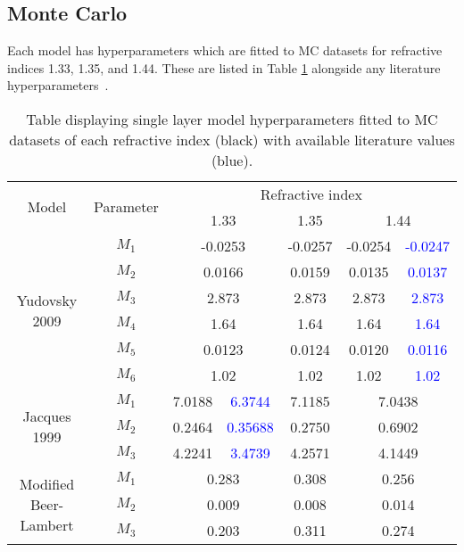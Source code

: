 \subsection{Monte Carlo}\label{sec:resultsMC}
Each model has hyperparameters which are fitted to MC datasets for refractive indices 1.33, 1.35, and 1.44. These are listed in 
Table \ref{tb:fittedmodelparams}
alongside any literature hyperparameters~\citep{Jacques1999, Yudovsky2009}.
\begin{table}[htb!]
    \centering
    \caption{Table displaying single layer model hyperparameters fitted to MC datasets of each refractive index (black) with available literature values (blue).}
    \begin{tabular}{|cc|cc|c|cc|}
        \hline
        \multirow{2}{*}{Model} & \multirow{2}{*}{Parameter} & \multicolumn{5}{c|}{Refractive index} \\
         & & \multicolumn{2}{c|}{1.33} & 1.35 & \multicolumn{2}{c|}{1.44} \\
        \hline
        \multirow{6}{*}{Yudovsky 2009} & $M_1$ & \multicolumn{2}{c|}{-0.0253} & -0.0257 & -0.0254 & \textcolor{blue}{-0.0247} \\
        & $M_2$ & \multicolumn{2}{c|}{0.0166} & 0.0159 & 0.0135 & \textcolor{blue}{0.0137} \\
        & $M_3$ & \multicolumn{2}{c|}{2.873} & 2.873 & 2.873 & \textcolor{blue}{2.873} \\
        & $M_4$ & \multicolumn{2}{c|}{1.64} & 1.64 & 1.64 & \textcolor{blue}{1.64} \\
        & $M_5$ & \multicolumn{2}{c|}{0.0123} & 0.0124 & 0.0120 & \textcolor{blue}{0.0116} \\
        & $M_6$ & \multicolumn{2}{c|}{1.02} & 1.02 & 1.02 & \textcolor{blue}{1.02} \\
        \hline 
        \multirow{3}{*}{Jacques 1999} & $M_1$ & 7.0188 & \textcolor{blue}{6.3744} & 7.1185 & \multicolumn{2}{c|}{7.0438} \\
        & $M_2$ & 0.2464 & \textcolor{blue}{0.35688} & 0.2750 & \multicolumn{2}{c|}{0.6902} \\
        & $M_3$ & 4.2241 & \textcolor{blue}{3.4739} & 4.2571 & \multicolumn{2}{c|}{4.1449} \\
        \hline
        \multirow{3}{*}{Modified Beer-Lambert} & $M_1$ & \multicolumn{2}{c|}{0.283} & 0.308 & \multicolumn{2}{c|}{0.256} \\
        & $M_2$ & \multicolumn{2}{c|}{0.009} & 0.008 & \multicolumn{2}{c|}{0.014} \\
        & $M_3$ & \multicolumn{2}{c|}{0.203} & 0.311 & \multicolumn{2}{c|}{0.274} \\
        \hline
    \end{tabular}
    \label{tb:fittedmodelparams}%
\end{table}

